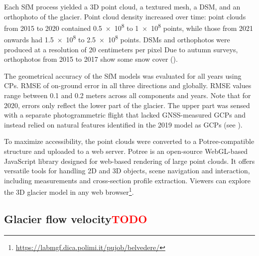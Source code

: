Each SfM process yielded a 3D point cloud, a textured mesh, a DSM, and an orthophoto of the glacier. 
Point cloud density increased over time: point clouds from 2015 to 2020 contained \SI{0.5e8}{} to \SI{1e8}{} 
points, while those from 2021 onwards had \SI{1.5e8}{} to \SI{2.5e8}{} points. 
DSMs and orthophotos were produced at a resolution of 20 centimeters per pixel 
Due to autumn surveys, orthophotos from 2015 to 2017 show some snow cover ().

The geometrical accuracy of the SfM models was evaluated for all years using CPs.
 RMSE of on-ground error in all three directions and globally. 
RMSE values range between 0.1 and 0.2 meters across all components and years. 
Note that for 2020, errors only reflect the lower part of the glacier. 
The upper part was sensed with a separate photogrammetric flight that lacked GNSS-measured
GCPs and instead relied on natural features identified in the 2019 model as GCPs (see ).


To maximize accessibility, the point clouds were converted to a Potree-compatible structure\citep{schutz2016potree}
and uploaded to a web server.
Potree is an open-source WebGL-based JavaScript library designed for web-based rendering of large point 
clouds\citep{schutz2016potree, Gaspari2024}.
It offers versatile tools for handling 2D and 3D objects, scene navigation and interaction,
including measurements and cross-section profile extraction.
Viewers can explore the 3D glacier model in any web browser\footnote{\url{https://labmgf.dica.polimi.it/pujob/belvedere/}}.

\subsection{Glacier flow velocity\textcolor{red}{TODO}}\label{sec:3:res:velocity}

